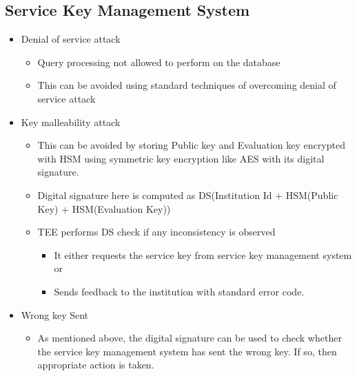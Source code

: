 \subsection{Service Key Management System}
\begin{itemize}
    \item Denial of service attack
          \begin{itemize}
              \item Query processing not allowed to perform on the database
              \item This can be avoided using standard techniques of overcoming denial of service attack
          \end{itemize}
    \item Key malleability attack
          \begin{itemize}
              \item This can be avoided by storing Public key and Evaluation key encrypted with HSM using symmetric key encryption like AES with its digital signature.
              \item Digital signature here is computed as DS(Institution Id + HSM(Public Key) + HSM(Evaluation Key))
              \item TEE performs DS check if any inconsistency is observed
                    \begin{itemize}
                        \item It either requests the service key from service key management system or
                        \item Sends feedback to the institution with standard error code.
                    \end{itemize}
          \end{itemize}
    \item Wrong key Sent
          \begin{itemize}
              \item As mentioned above, the digital signature can be used to check whether the service key management system has sent the wrong key. If so, then appropriate action is taken.
          \end{itemize}
\end{itemize}

